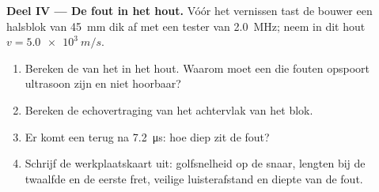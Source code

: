 \begin{problem}
\medskip
\noindent\textbf{Deel IV --- De fout in het hout.}
Vóór het vernissen tast de bouwer een halsblok van \qty{45}{mm} dik af met
een tester van \qty{2.0}{MHz}; neem in dit hout $v = \qty{5.0e3}{m/s}$.
\begin{enumerate}[resume]
  \item Bereken de  van het  in het hout. Waarom
        moet een  die fouten opspoort ultrasoon zijn en niet hoorbaar?
  \item Bereken de echovertraging van het achtervlak van het blok.
  \item Er komt een  terug na \qty{7.2}{\micro s}: hoe diep zit de
        fout?
  \item Schrijf de werkplaatskaart uit: golfsnelheid op de snaar, lengten
        bij de twaalfde en de eerste fret, veilige luisterafstand en
        diepte van de fout.
\end{enumerate}
\end{problem}

